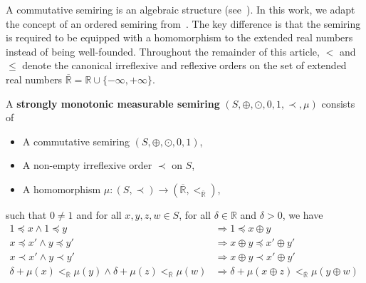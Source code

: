 A commutative semiring is an algebraic structure (see~\cite{bruggink2015proving}\cite{endrullis2024generalized_arxiv_v2}). In this work, we adapt the concept of an ordered semiring from~\cite{endrullis2024generalized_arxiv_v2}. 
The key difference is that the semiring is required to be equipped with a homomorphism to the extended real numbers instead of being well-founded.
Throughout the remainder of this article, $<$ and $\leq$ denote the canonical irreflexive and reflexive orders on the set of extended real numbers $\overline{\mathbb{R}} = \mathbb{R} \cup \{-\infty, +\infty\}$.
\begin{definition}
    \label{def:real_strongly_monotonic_semiring}
    A \textbf{strongly monotonic measurable semiring} $(S, \oplus, \odot, 0, 1, \prec, \mu)$ consists of
    \begin{itemize} 
        \item A commutative semiring $(S, \oplus, \odot, 0, 1)$,
        \item A non-empty irreflexive order $\prec$ on $S$,
        \item A homomorphism $\mu : (S, \prec) \to ( \overline{\mathbb{R}}, <_{\overline{\mathbb{R}}} )$,
    \end{itemize}
    such that $0 \neq 1$ and for all $x,y,z,w \in S$, for all $\delta \in \mathbb{R}$ and $\delta>0$, we have
        \begin{align*}
            1 \preceq x \land 1 \preceq y 
            &\Rightarrow
            1 \preceq x \oplus y
            &\tag{S0} \label{ax:s0} 
            \\ 
            x \preceq x' \land y \preceq y' 
            &\Rightarrow
            x \oplus y \preceq x' \oplus y'
            &\tag{S1} \label{ax:s1} 
            \\   
            x \prec x' \land y \prec y'  
            &\Rightarrow
            x \oplus y \prec x' \oplus y'
            &\tag{S2} \label{ax:s2} 
            \\
            \delta + \mu(x) <_{\overline{\mathbb{R}}} \mu(y) \land \delta + \mu(z) <_{\overline{\mathbb{R}}} \mu(w)
            &\Rightarrow
            \delta + \mu(x \oplus z) <_{\overline{\mathbb{R}}} \mu(y \oplus w)
            &\tag{S3} \label{ax:s2'}
            \\

\end{align*}
\end{definition}
